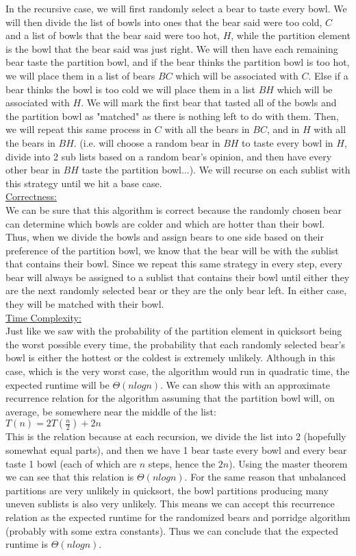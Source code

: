 \documentclass[10pt]{article}
\begin{document}
\begin{enumerate}
{    In the recursive case, we will first randomly select a bear to taste every bowl. We will then divide the list of bowls into ones that the bear said were too cold, $C$ and a list of bowls that the bear said were too hot, $H$, while the partition element is the bowl that the bear said was just right. We will then have each remaining bear taste the partition bowl, and if the bear thinks the partition bowl is too hot, we will place them in a list of bears $BC$ which will be associated with $C$. Else if a bear thinks the bowl is too cold we will place them in a list $BH$ which will be associated with $H$. We will mark the first bear that tasted all of the bowls and the partition bowl as "matched" as there is nothing left to do with them. Then, we will repeat this same process in $C$ with all the bears in $BC$, and in $H$ with all the bears in $BH$. (i.e. will choose a random bear in $BH$ to taste every bowl in $H$, divide into 2 sub lists based on a random bear's opinion, and then have every other bear in $BH$ taste the partition bowl...). We will recurse on each sublist with this strategy until we hit a base case. \\
    \underline{Correctness:} \\ We can be sure that this algorithm is correct because the randomly chosen bear can determine which bowls are colder and which are hotter than their bowl. Thus, when we divide the bowls and assign bears to one side based on their preference of the partition bowl, we know that the  bear will be with the sublist that contains their bowl. Since we repeat this same strategy in every step, every bear will always be assigned to a sublist that contains their bowl until either they are the next randomly selected bear or they are the only bear left. In either case, they will be matched with their bowl. \\
    \underline{Time Complexity:} \\
    Just like we saw with the probability of the partition element in quicksort being the worst possible every time, the probability that each randomly selected bear's bowl is either the hottest or the coldest is extremely unlikely. Although in this case, which is the very worst case, the algorithm would run in quadratic time, the expected runtime will be $\Theta(nlog n)$. We can show this with an approximate recurrence relation for the algorithm assuming that the partition bowl will, on average, be somewhere near the middle of the list: \\
    $T(n) = 2T(\frac{n}{2}) + 2n$ \\
    This is the relation because at each recursion, we divide the list into 2 (hopefully somewhat equal parts), and then we have 1 bear taste every bowl and every bear taste 1 bowl (each of which are $n$ steps, hence the $2n$). Using the master theorem we can see that this relation is $\Theta(nlog n)$. For the same reason that unbalanced partitions are very unlikely in quicksort, the bowl partitions producing many uneven sublists is also very unlikely. This means we can accept this recurrence relation as the expected runtime for the randomized bears and porridge algorithm (probably with some extra constants). Thus we can conclude that the expected runtime is $\Theta(nlog n)$.
    }
\end{enumerate}
\end{document}
